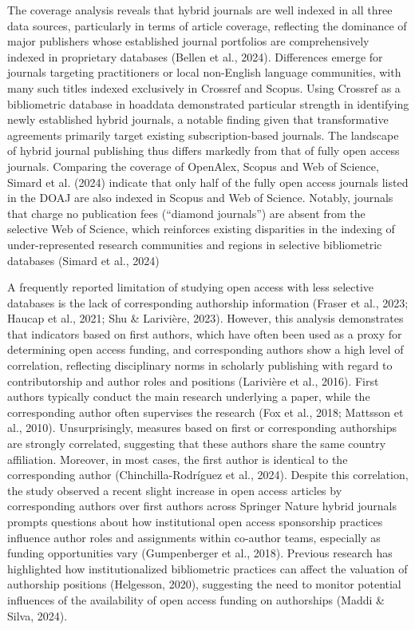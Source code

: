 \documentclass[a4paper,man,floatsintext,longtable,noextraspace,10pt]{apa6}
\begin{document}
The coverage analysis reveals that hybrid journals are well indexed in
all three data sources, particularly in terms of article coverage,
reflecting the dominance of major publishers whose established journal
portfolios are comprehensively indexed in proprietary databases (Bellen
et al., 2024). Differences emerge for journals targeting practitioners
or local non-English language communities, with many such titles indexed
exclusively in Crossref and Scopus. Using Crossref as a bibliometric
database in hoaddata demonstrated particular strength in identifying
newly established hybrid journals, a notable finding given that
transformative agreements primarily target existing subscription-based
journals. The landscape of hybrid journal publishing thus differs
markedly from that of fully open access journals. Comparing the coverage
of OpenAlex, Scopus and Web of Science, Simard et al. (2024) indicate
that only half of the fully open access journals listed in the DOAJ are
also indexed in Scopus and Web of Science. Notably, journals that charge
no publication fees (``diamond journals'') are absent from the selective
Web of Science, which reinforces existing disparities in the indexing of
under-represented research communities and regions in selective
bibliometric databases (Simard et al., 2024)

A frequently reported limitation of studying open access with less
selective databases is the lack of corresponding authorship information
(Fraser et al., 2023; Haucap et al., 2021; Shu \& Larivière, 2023).
However, this analysis demonstrates that indicators based on first
authors, which have often been used as a proxy for determining open
access funding, and corresponding authors show a high level of
correlation, reflecting disciplinary norms in scholarly publishing with
regard to contributorship and author roles and positions (Larivière et
al., 2016). First authors typically conduct the main research underlying
a paper, while the corresponding author often supervises the research
(Fox et al., 2018; Mattsson et al., 2010). Unsurprisingly, measures
based on first or corresponding authorships are strongly correlated,
suggesting that these authors share the same country affiliation.
Moreover, in most cases, the first author is identical to the
corresponding author (Chinchilla-Rodríguez et al., 2024). Despite this
correlation, the study observed a recent slight increase in open access
articles by corresponding authors over first authors across Springer
Nature hybrid journals prompts questions about how institutional open
access sponsorship practices influence author roles and assignments
within co-author teams, especially as funding opportunities vary
(Gumpenberger et al., 2018). Previous research has highlighted how
institutionalized bibliometric practices can affect the valuation of
authorship positions (Helgesson, 2020), suggesting the need to monitor
potential influences of the availability of open access funding on
authorships (Maddi \& Silva, 2024).
\end{document}
